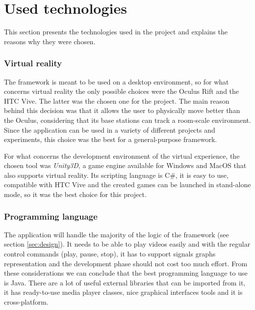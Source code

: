 \documentclass[binding=0.6cm,LaM]{sapthesis}
\begin{document}
\section{Used technologies}
This section presents the technologies used in the project and explains the reasons why they were chosen.

\subsubsection{Virtual reality}
The framework is meant to be used on a desktop environment, so for what concerns virtual reality the only possible choices were the Oculus Rift and the HTC Vive. The latter was the chosen one for the project. The main reason behind this decision was that it allows the user to physically move better than the Oculus, considering that its base stations can track a room-scale environment. Since the application can be used in a variety of different projects and experiments, this choice was the best for a general-purpose framework.

For what concerns the development environment of the virtual experience, the chosen tool was \textit{Unity3D}, a game engine available for Windows and MacOS that also supports virtual reality. Its scripting language is C\#, it is easy to use, compatible with HTC Vive and the created games can be launched in stand-alone mode, so it was the best choice for this project. 

\subsubsection{Programming language}
The application will handle the majority of the logic of the framework (see section \ref{sec:design}). It needs to be able to play videos easily and with the regular control commands (play, pause, stop), it has to support signals graphs representation and the development phase should not cost too much effort.
From these considerations we can conclude that the best programming language to use is Java. There are a lot of useful external libraries that can be imported from it, it has ready-to-use media player classes, nice graphical interfaces tools and it is cross-platform. 
\end{document}
